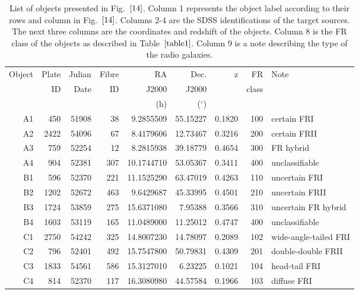 \documentclass[usenatbib]{mn2e}
\begin{document}
\begin{table*}

\begin{tabular}{rrrrrrrrl}
\hline
Object&Plate & Julian & Fibre & RA      & Dec.        & z &   FR    & Note \\
      &ID    & Date   & ID    &  J2000  &  J2000      &   &  class &   \\
      &      &        &       & (h)     & ($^{\circ}$)&   &        &  \\    
\hline 
A1&450&51908&38& 9.2855509 &  55.15227 &   0.1820&100& certain FRI\\
A2&2422&54096&67&8.4179606  & 12.73467  &  0.3216 &200&certain FRII\\
A3&759&52254&12&8.2815938  & 39.18779 &   0.4654 &300&FR hybrid\\
A4&904&52381&307&10.1744710 &  53.05367  &  0.3411&400&unclassifiable\\
B1&596&52370&221& 11.1525290 & 63.47019  &  0.4263 &110&uncertain FRI\\
B2&1202&52672&463& 9.6429687  & 45.33995  &  0.4501&210&uncertain FRII\\
B3&1724&53859&275& 15.6371080  &  7.95388  &  0.3566&310&uncertain FR hybrid\\
B4&1603&53119&165& 11.0489000  & 11.25012 &   0.4747 &400&unclassifiable\\
C1&2750&54242&325& 14.8007230  & 14.78097  &  0.2089 &102&wide-angle-tailed FRI\\
C2&796&52401&492& 15.7547800 &  50.79831  &  0.4309&201&double-double FRII\\
C3&1833&54561&586& 15.3127010 &   6.23225 &   0.1021&104&head-tail FRI\\
C4&814&52370&117& 16.3080980  & 44.57584  &  0.1966&103&diffuse FRI\\
\hline  
\end{tabular}
\caption{List of objects presented in Fig.~$\ref{14}$. Column 1 represents the
  object label according to their rows and column in Fig.~$\ref{14}$. Columns 2-4
  are the SDSS identifications of the target sources. The next three
  columns are the coordinates and redshift of the objects. Column 8 is the
  FR class of the objects as described in Table~$\ref{table1}$. Column 9
  is a note describing the type of the radio galaxies.
\label{table4}
}
\end{table*}
\end{document}
